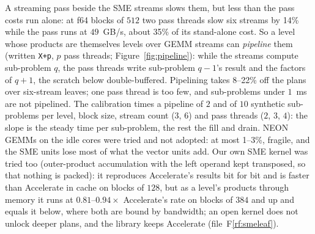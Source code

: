 \documentclass[11pt]{article}
\newcommand{\rf}[1]{F\ref{rf:#1}}
\newcommand{\lv}[1]{\texttt{#1}}
\begin{document}
A streaming pass beside the SME streams slows them, but less than the pass
costs run alone: at f64 blocks of $512$ two pass threads slow six streams by
14\% while the pass runs at $49$~GB/s, about 35\% of its stand-alone cost.  So
a level whose products are themselves levels over GEMM streams can
\emph{pipeline} them (written \lv{X+p}, $p$ pass threads; Figure~\ref{fig:pipeline}): while the streams
compute sub-problem $q$, the pass threads write sub-problem $q-1$'s result
and the factors of $q+1$, the scratch below double-buffered.  Pipelining
takes 8--22\% off the plans over six-stream leaves; one pass thread is too
few, and sub-problems under $1$~ms are not pipelined.  The calibration times
a pipeline of $2$ and of $10$ synthetic sub-problems per level, block size,
stream count ($3$, $6$) and pass threads ($2$, $3$, $4$): the slope is the
steady time per sub-problem, the rest the fill and drain.  NEON GEMMs on the
idle cores were tried and not adopted: at most 1--3\%, fragile, and the SME
units lose most of what the vector units add.  Our own SME kernel was tried
too (outer-product accumulation with the left operand kept transposed, so
that nothing is packed): it reproduces Accelerate's results bit for bit and
is faster than Accelerate in cache on blocks of $128$, but as a level's
products through memory it runs at $0.81$--$0.94\times$ Accelerate's rate on
blocks of $384$ and up and equals it below, where both are bound by
bandwidth; an open kernel does not unlock deeper plans, and the library keeps
Accelerate (file~\rf{smeleaf}).
\end{document}
